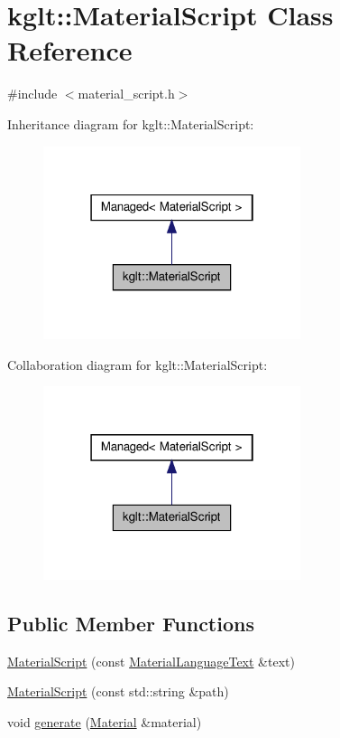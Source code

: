 \hypertarget{classkglt_1_1_material_script}{\section{kglt\-:\-:Material\-Script Class Reference}
\label{classkglt_1_1_material_script}
}


{\ttfamily \#include $<$material\-\_\-script.\-h$>$}



Inheritance diagram for kglt\-:\-:Material\-Script\-:\nopagebreak
\begin{figure}[H]
\begin{center}
\leavevmode
\includegraphics[width=214pt]{classkglt_1_1_material_script__inherit__graph}
\end{center}
\end{figure}


Collaboration diagram for kglt\-:\-:Material\-Script\-:\nopagebreak
\begin{figure}[H]
\begin{center}
\leavevmode
\includegraphics[width=214pt]{classkglt_1_1_material_script__coll__graph}
\end{center}
\end{figure}
\subsection*{Public Member Functions}
\begin{DoxyCompactItemize}
\item 
\hyperlink{classkglt_1_1_material_script_a29b694f04444498da6e221500a68d363}{Material\-Script} (const \hyperlink{classkglt_1_1_material_language_text}{Material\-Language\-Text} \&text)
\item 
\hyperlink{classkglt_1_1_material_script_a0ab76b332b121705689003d7cb7cea60}{Material\-Script} (const std\-::string \&path)
\item 
void \hyperlink{classkglt_1_1_material_script_ac3ea6e97cadbaf9a4c409746da9da2b6}{generate} (\hyperlink{classkglt_1_1_material}{Material} \&material)
\end{DoxyCompactItemize}
